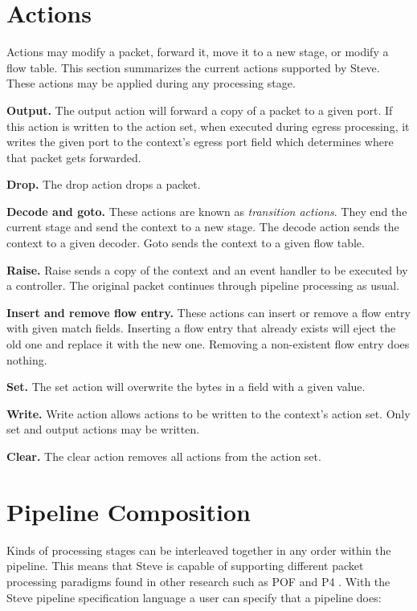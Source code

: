 \section{Actions} \label{action_desc}

Actions may modify a packet, forward it, move it to a new stage, or modify a flow table. This section summarizes the current actions supported by Steve. These actions may be applied during any processing stage.

\textbf{Output.} The output action will forward a copy of a packet to a given port. If this action is written to the action set, when executed during egress processing, it writes the given port to the context's egress port field which determines where that packet gets forwarded.

\textbf{Drop.} The drop action drops a packet.

\textbf{Decode and goto.} These actions are known as \textit{transition actions}. They end the current stage and send the context to a new stage. The decode action sends the context to a given decoder. Goto sends the context to a given flow table.

\textbf{Raise.} Raise sends a copy of the context and an event handler to be executed by a controller. The original packet continues through pipeline processing as usual.

\textbf{Insert and remove flow entry.} These actions can insert or remove a flow entry with given match fields. Inserting a flow entry that already exists will eject the old one and replace it with the new one. Removing a non-existent flow entry does nothing.

\textbf{Set.} The set action will overwrite the bytes in a field with a given value.

\textbf{Write.} Write action allows actions to be written to the context's action set. Only set and output actions may be written.

\textbf{Clear.} The clear action removes all actions from the action set.

\section{Pipeline Composition} \label{pipeline_comp_desc}

Kinds of processing stages can be interleaved together in any order within the
pipeline. This means that Steve is capable of supporting different packet
processing paradigms found in other research such as POF \cite{pof, pof_fis, pof_impl} and P4 \cite{p4_spec, p4_spec2}. With the Steve
pipeline specification language a user can specify that a pipeline does:

